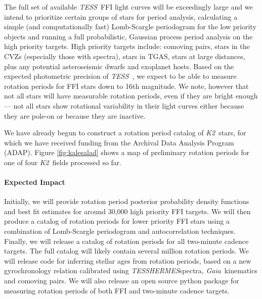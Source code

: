 \documentclass[letterpaper,12pt,preprint]{hack_aastex}
\newcommand{\Ktwo}{{\it K2}}
\newcommand{\ktwo}{\Ktwo}
\newcommand{\TESS}{{\it TESS}}
\newcommand{\tess}{{\it TESS}}
\newcommand{\Gaia}{{\it Gaia}}
\newcommand{\HERMES}{{\it HERMES}}
\begin{document}
The full set of available \TESS\ FFI light curves will be exceedingly large
and we intend to prioritize certain groups of stars for period analysis,
calculating a simple (and computationally fast) Lomb-Scargle periodogram for
the low priority objects and running a full probabilistic, Gaussian process
period analysis on the high priority targets.
High priority targets include: comoving pairs, stars in the CVZs (especially
those with spectra), stars in TGAS, stars at large distances, plus any
potential asteroseismic dwarfs and exoplanet hosts.
Based on the expected photometric precision of \tess\ \citep{sullivan2015}, we
expect to be able to measure rotation periods for FFI stars down to 16th
magnitude.
We note, however that not all stars will have measurable rotation periods,
even if they are bright enough --- not all stars show rotational variability
in their light curves either because they are pole-on or because they are
inactive.

We have already begun to construct a rotation period catalog of \ktwo\ stars,
for which we have received funding from the Archival Data Analysis Program
(ADAP).
Figure \ref{fig:kalesalad} shows a map of preliminary rotation periods for one
of four \ktwo\ fields processed so far.


\paragraph{Expected Impact}
Initially, we will provide rotation period posterior probability density
functions and best fit estimates for around 30,000 high priority FFI targets.
We will then produce a catalog of rotation periods for lower priority FFI
stars using a combination of Lomb-Scargle periodogram and autocorrelation
techniques.
Finally, we will release a catalog of rotation periods for all two-minute
cadence targets.
The full catalog will likely contain several million rotation periods.
We will release code for inferring stellar ages from rotation periods, based
on a new gyrochronology relation calibrated using \TESS\HERMES spectra, \Gaia\
kinematics and comoving pairs.
We will also release an open source python package for measuring rotation
periods of both FFI and two-minute cadence targets.
\end{document}
